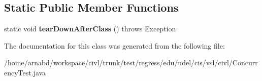 \subsection*{Static Public Member Functions}
\begin{DoxyCompactItemize}
\item 
\hypertarget{classedu_1_1udel_1_1cis_1_1vsl_1_1civl_1_1ConcurrencyTest_af02f3b5b796e2b1b402013fe02986bf8}{}static void {\bfseries tear\+Down\+After\+Class} ()  throws Exception \label{classedu_1_1udel_1_1cis_1_1vsl_1_1civl_1_1ConcurrencyTest_af02f3b5b796e2b1b402013fe02986bf8}

\end{DoxyCompactItemize}


The documentation for this class was generated from the following file\+:\begin{DoxyCompactItemize}
\item 
/home/arnabd/workspace/civl/trunk/test/regress/edu/udel/cis/vsl/civl/Concurrency\+Test.\+java\end{DoxyCompactItemize}
